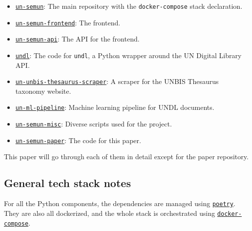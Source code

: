 \begin{itemize}
    \item \href{https://github.com/ClementSicard/un-semun}{\faGithub{} \texttt{un-semun}}: The main repository with the \texttt{docker-compose} stack declaration.
    \item \href{https://github.com/ClementSicard/un-semun-frontend}{\faGithub{} \texttt{un-semun-frontend}}: The frontend.
    \item \href{https://github.com/ClementSicard/un-semun-api}{\faGithub{} \texttt{un-semun-api}}: The API for the frontend.
    \item \href{https://github.com/ClementSicard/undl}{\faGithub{} \texttt{undl}}: The code for \texttt{undl}, a Python wrapper around the UN Digital Library API.
    \item \href{https://github.com/ClementSicard/un-unbis-thesaurus-scraper}{\faGithub{} \texttt{un-unbis-thesaurus-scraper}}: A scraper for the UNBIS Thesaurus taxonomy website.
    \item \href{https://github.com/ClementSicard/un-ml-pipeline}{\faGithub{} \texttt{un-ml-pipeline}}: Machine learning pipeline for UNDL documents.
    \item \href{https://github.com/ClementSicard/un-semun-misc}{\faGithub{} \texttt{un-semun-misc}}: Diverse scripts used for the project.
    \item \href{https://github.com/ClementSicard/un-semun-paper}{\faGithub{} \texttt{un-semun-paper}}: The code for this paper.
\end{itemize}

This paper will go through each of them in detail except for the paper repository.






















\subsection{General tech stack notes} \label{ssec:general-tech-stack-notes}

For all the Python components, the dependencies are managed using \href{https://github.com/python-poetry/poetry}{\texttt{poetry}}. They are also all dockerized, and the whole stack is orchestrated using \href{https://docs.docker.com/compose/}{\texttt{docker-compose}}.
